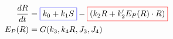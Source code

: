 \documentclass[preview]{standalone}
\begin{document}
\pagestyle{empty}
\begin{equation*}
\begin{aligned}
	\frac{dR}{dt} & = {\color{blue}\boxed{\color{black} k_0 + k_1 S }} - \color{red}{\boxed{\color{black} (k_2 R + k_2' E_P(R) \cdot R)}} \\ 
	E_P(R) & = G(k_3, k_4 R, J_3, J_4)
\end{aligned}
\end{equation*}
\vfill
\end{document}
